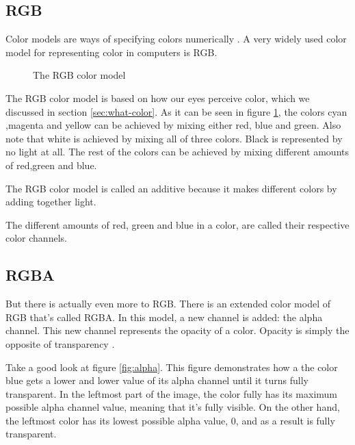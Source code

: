 \subsection{RGB}
\label{sec:rgb}

Color models are ways of specifying colors
numerically \cite{fadgi11:color_model}. A very widely used color
model for representing color in computers is RGB.

\begin{figure}
  \centering
  \caption{The RGB color model}
  \label{fig:rgb}
\end{figure}

The RGB color model is based on how our eyes perceive color, which
we discussed in section \ref{sec:what-color}. As it can be seen in
figure \ref{fig:rgb}, the colors cyan ,magenta and yellow can be
achieved by mixing either red, blue and green. Also note that white
is achieved by mixing all of three colors. Black is represented by
no light at all. The rest of the colors can be achieved by mixing
different amounts of red,green and blue.

The RGB color model is called an additive
because it makes different colors by adding together light.

The different amounts of red, green and blue in a color, are called
their respective color channels.

\subsection{RGBA}


But there is actually even more to RGB. There is an extended color
model of RGB that's called RGBA. In this model, a new channel is
added: the alpha channel. This new channel
represents the opacity of a color. Opacity is simply the opposite of
transparency \cite{porter84_compos_dig_img}.

Take a good look at figure \ref{fig:alpha}. This figure demonstrates
how a the color blue gets a lower and lower value of its alpha
channel until it turns fully transparent. In the leftmost part of
the image, the color fully has its maximum possible alpha channel
value, meaning that it's fully visible. On the other hand, the
leftmost color has its lowest possible alpha value, $0$, and as a
result is fully transparent.

